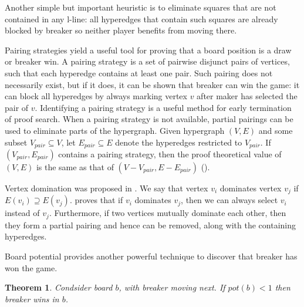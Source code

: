 \documentclass[conference]{IEEEtran}
\newtheorem{theorem}{Theorem}[section]
\theoremstyle{definition}
\begin{document}
Another simple but important heuristic is to eliminate squares that are not contained in any l-line: all hyperedges that contain such squares are already blocked by breaker so neither player benefits from moving there.

Pairing strategies \cite{Hales1987, BerlekampElwynR1983Wwfy,UITERWIJK200043,inf_inf_8} yield a useful tool for proving that a board position is a draw or breaker win. A pairing strategy is a set of pairwise disjunct pairs of vertices, such that each hyperedge contains at least one pair. Such pairing does not necessarily exist, but if it does, it can be shown that breaker can win the game: it can block all hyperedges by always marking vertex $v$ after maker has selected the pair of $v$. Identifying a pairing strategy is a useful method for early termination of proof search. When a pairing strategy is not available, partial pairings can be used to eliminate parts of the hypergraph. Given hypergraph $(V, E)$ and some subset $V_{pair} \subseteq V$, let $E_{pair} \subseteq E$ denote the hyperedges restricted to $V_{pair}$. If $(V_{pair}, E_{pair})$ contains a pairing strategy, then the proof theoretical value of $(V, E)$ is the same as that of $(V - V_{pair}, E - E_{pair})$ (\cite{HSU202079}).

Vertex domination was proposed in \cite{HSU202079}. We say that vertex $v_i$ dominates vertex $v_j$ if $E(v_i) \supseteq E(v_j)$. \cite{HSU202079} proves that if $v_i$ dominates $v_j$, then we can always select $v_i$ instead of $v_j$. Furthermore, if two vertices mutually dominate each other, then they form a partial pairing and hence can be removed, along with the containing hyperedges.

Board potential provides another powerful technique to discover that breaker has won the game.

\begin{theorem}
\label{thm:breaker_win}
Condsider board $b$, with breaker moving next. If $pot(b) < 1$ then breaker wins in $b$.
\end{theorem}
\end{document}
